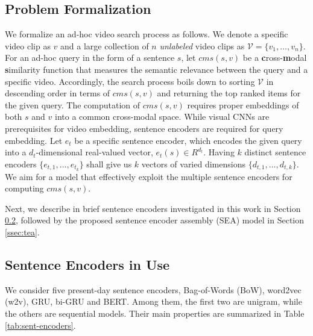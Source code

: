 \subsection{Problem Formalization}

We formalize an ad-hoc video search process as follows. We denote a specific video clip as $v$ and a large collection of $n$ \emph{unlabeled} video clips as $\mathcal{V}=\{v_1,\ldots,v_n\}$. For an ad-hoc query in the form of a sentence $s$, let $cms(s,v)$ be a \textbf{c}ross-\textbf{m}odal \textbf{s}imilarity function that measures the semantic relevance between the query and a specific video. Accordingly, the search process boils down to sorting $\mathcal{V}$ in descending order in terms of $cms(s,v)$ and returning the top ranked items for the given query. The computation of $cms(s,v)$ requires proper embeddings of both $s$ and $v$ into a common cross-modal space. While visual CNNs are prerequisites for video embedding, sentence encoders are required for query embedding. Let $e_t$ be a specific sentence encoder, which encodes the given query into a $d_t$-dimensional real-valued vector, \ie $e_t(s) \in R^{d_t}$.
Having $k$ distinct sentence encoders $\{e_{t,1},\ldots,e_{t_k}\}$ shall give us $k$ vectors of varied dimensions $\{d_{t,1},\ldots,d_{t,k}\}$. We aim for a model that effectively exploit the multiple sentence encoders for computing $cms(s,v)$.

Next, we describe in brief sentence encoders investigated in this work in Section \ref{ssec:tes}, followed by the proposed sentence encoder assembly (SEA) model in Section \ref{ssec:tea}.

\subsection{Sentence Encoders in Use} \label{ssec:tes}

We consider five present-day sentence encoders, \ie Bag-of-Words (BoW), word2vec (w2v), GRU, bi-GRU and BERT. Among them, the first two are unigram, while the others are sequential models. Their main properties are summarized in Table \ref{tab:sent-encoders}.




